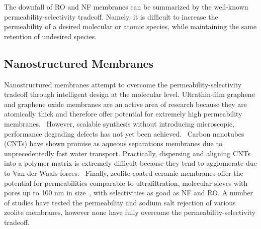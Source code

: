 \documentclass{article}
\begin{document}
  The downfall of RO and NF membranes can be summarized by the well-known
  permeability-selectivity tradeoff. Namely, it is difficult to increase the
  permeability of a desired molecular or atomic species, while maintaining
  the same retention of undesired species.\cite{werber_materials_2016}  
  
  \subsection*{Nanostructured Membranes}
  
  Nanostructured membranes attempt to overcome the permeability-selectivity 
  tradeoff through intelligent design at the molecular level. 
  Ultrathin-film graphene and graphene oxide membranes are an active area
  of research because they are atomically thick and therefore offer potential
  for extremely high permeability membranes.~\cite{humplik_nanostructured_2011}
  However, scalable synthesis without introducing microscopic, performance
  degrading defects has not yet been achieved.~\cite{cohen-tanugi_multilayer_2016,wei_multilayered_2018}
  Carbon nanotubes (CNTs) have shown promise as aqueous separations membranes
  due to unprecedentedly fast water transport.\cite{humplik_nanostructured_2011,hummer_water_2001} 
  Practically, dispersing and aligning CNTs into a polymer matrix is extremely
  difficult because they tend to agglomerate due to Van der Waals forces.~\cite{sahoo_polymer_2010}
  Finally, zeolite-coated ceramic membranes offer the potential for permeabilities
  comparable to ultrafiltration, molecular sieves with pores up to 100 nm in 
  size~\cite{werber_materials_2016}, with selectivities as good as NF and RO. 
  A number of studies have tested the permeability and sodium salt rejection
  of various zeolite membranes, however none have fully overcome the 
  permeability-selectivity tradeoff.~\cite{pendergast_review_2011,auerbach_handbook_2003,li_novel_2007}
\end{document}
